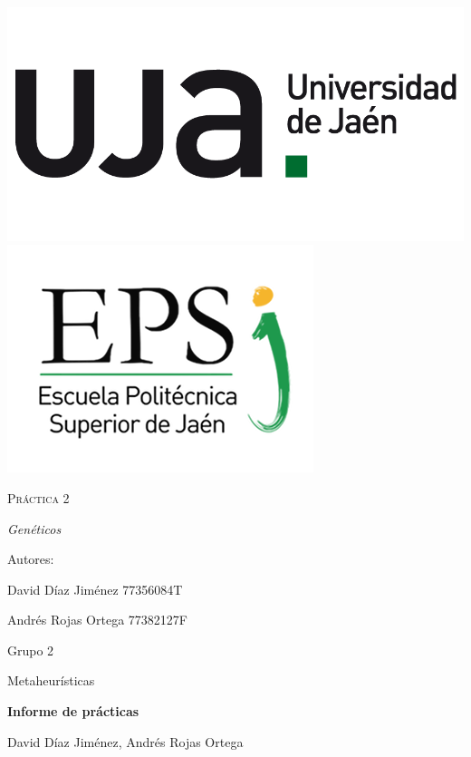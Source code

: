 	\begin{titlepage}
		\centering
		{\includegraphics[scale=0.2]{img/np_UJA_generica_6.png}
		\includegraphics[scale=0.35]{img/Logo_EPS.png}}
		\vspace{1cm}
		{\scshape\Huge Práctica 2 \par}
		\vspace{3cm}
		{\itshape\Large Genéticos \par}
		\vfill
		{\Large Autores: \par}
		{\Large David Díaz Jiménez 77356084T \par}
		{\Large Andrés Rojas Ortega 77382127F\par}
		\vfill
		{\Large Grupo 2 \par}
	\end{titlepage}

	\begin{center}
	
	\begin{large}
		
		Metaheurísticas
		
	\end{large}
	
		\vspace*{0.2in}
		\textbf{\large Informe de prácticas}
		
		\vspace*{.2in}
		
		David Díaz Jiménez, Andrés Rojas Ortega
		
		\vspace*{2.5cm}
		
	\end{center}
	
	\tableofcontents
	
	\newpage